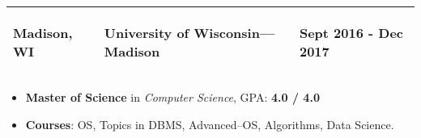 \documentclass[a4paper, 10pt]{extarticle}
\begin{document}
\begin{large}

{\begin{tabular}{ p{3cm} p{10cm} p{4.4cm} }
    \textbf{Madison, WI} & \vspace{-.6cm} \begin{center}\textbf{{University of Wisconsin---Madison}} \end{center} \vspace{-0.8cm} &
    \vspace{-0.6cm}
    \begin{flushright}
    \textbf{Sept 2016 - Dec 2017} 
    \end{flushright}
    \vspace{-0.8cm}\\
        \hline
\end{tabular}}


\begin{itemize}
    \setlength\itemsep{-0.05 cm}
    \item {\textbf{Master of Science} in \textit{Computer Science}, GPA: \textbf{4.0 / 4.0}}
    \item{\textbf{Courses}: OS, Topics in DBMS,  Advanced--OS, Algorithms, Data Science.}
\end{itemize}


\end{large}
\end{document}
